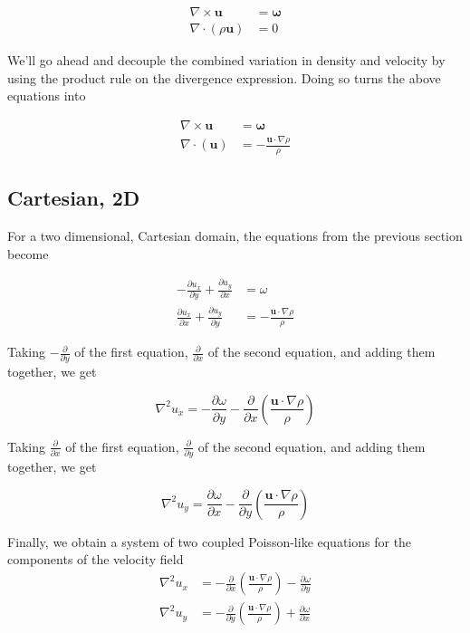 \documentclass[a4paper,10pt]{article}
\newcommand{\vect}[1]{\bm{#1}}
\newcommand{\diverg}[1]{\nabla\cdot\left(#1\right)}
\newcommand{\partderiv}[2]{\frac{\partial #1}{\partial #2}}
\begin{document}
\begin{align}
\nabla\times\vect{u}&=\vect{\omega} \\
\diverg{\rho\vect{u}}&=0
\end{align}

We'll go ahead and decouple the combined variation in density and velocity by using the product rule on the divergence expression. Doing so turns the above equations into 


\begin{align}
\nabla\times\vect{u}&=\vect{\omega} \\
\diverg{\vect{u}}&=-\frac{\vect{u}\cdot\nabla\rho}{\rho}
\end{align}

\subsection{Cartesian, 2D}
For a two dimensional, Cartesian domain, the equations from the previous section become

\begin{align}
-\partderiv{u_x}{y} + \partderiv{u_y}{x} &= \omega \\
\partderiv{u_x}{x} + \partderiv{u_y}{y} &=-\frac{\vect{u}\cdot\nabla\rho}{\rho}
\end{align}

Taking $-\partderiv{}{y}$ of the first equation, $\partderiv{}{x}$ of the second equation, and adding them together, we get

\begin{equation}
\nabla^2{u_x} = -\partderiv{\omega}{y} - \partderiv{}{x}\left(\frac{\vect{u}\cdot\nabla\rho}{\rho}\right)
\end{equation}


Taking $\partderiv{}{x}$ of the first equation, $\partderiv{}{y}$ of the second equation, and adding them together, we get

\begin{equation}
\nabla^2{u_y} = \partderiv{\omega}{x} - \partderiv{}{y}\left(\frac{\vect{u}\cdot\nabla\rho}{\rho}\right)
\end{equation}

Finally, we obtain a system of two coupled Poisson-like equations for the components of the velocity field
\begin{align}
\nabla^2{u_x} &= -\partderiv{}{x}\left(\frac{\vect{u}\cdot\nabla\rho}{\rho}\right) - \partderiv{\omega}{y}\\
\nabla^2{u_y} &= -\partderiv{}{y}\left(\frac{\vect{u}\cdot\nabla\rho}{\rho}\right) + \partderiv{\omega}{x} 
\end{align}
\end{document}

